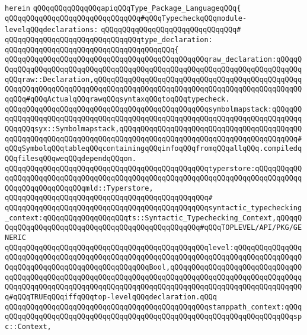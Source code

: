 \verb|herein|\newline
\newline
\verb|qQQqqQQqqQQqqQQqapiqQQqType_Package_LanguageqQQq{|\newline
\newline
\verb|qQQqqQQqqQQqqQQqqQQqqQQqqQQqqQQq#qQQqTypecheckqQQqmodule-levelqQQqdeclarations:|\newline
\verb|qQQqqQQqqQQqqQQqqQQqqQQqqQQqqQQq#|\newline
\verb|qQQqqQQqqQQqqQQqqQQqqQQqqQQqqQQqtype_declaration:|\newline
\verb|qQQqqQQqqQQqqQQqqQQqqQQqqQQqqQQqqQQqqQQq{|\newline
\verb|qQQqqQQqqQQqqQQqqQQqqQQqqQQqqQQqqQQqqQQqqQQqqQQqraw_declaration:qQQqqQQqqQQqqQQqqQQqqQQqqQQqqQQqqQQqqQQqqQQqqQQqqQQqqQQqqQQqqQQqqQQqqQQqqQQqqQQqraw::Declaration,qQQqqQQqqQQqqQQqqQQqqQQqqQQqqQQqqQQqqQQqqQQqqQQqqQQqqQQqqQQqqQQqqQQqqQQqqQQqqQQqqQQqqQQqqQQqqQQqqQQqqQQqqQQqqQQqqQQqqQQqqQQq#qQQqActualqQQqrawqQQqsyntaxqQQqtoqQQqtypecheck.|\newline
\verb|qQQqqQQqqQQqqQQqqQQqqQQqqQQqqQQqqQQqqQQqqQQqqQQqsymbolmapstack:qQQqqQQqqQQqqQQqqQQqqQQqqQQqqQQqqQQqqQQqqQQqqQQqqQQqqQQqqQQqqQQqqQQqqQQqqQQqqQQqqQQqsyx::Symbolmapstack,qQQqqQQqqQQqqQQqqQQqqQQqqQQqqQQqqQQqqQQqqQQqqQQqqQQqqQQqqQQqqQQqqQQqqQQqqQQqqQQqqQQqqQQqqQQqqQQqqQQqqQQqqQQqqQQq#qQQqSymbolqQQqtableqQQqcontainingqQQqinfoqQQqfromqQQqallqQQq.compiledqQQqfilesqQQqweqQQqdependqQQqon.|\newline
\verb|qQQqqQQqqQQqqQQqqQQqqQQqqQQqqQQqqQQqqQQqqQQqqQQqtyperstore:qQQqqQQqqQQqqQQqqQQqqQQqqQQqqQQqqQQqqQQqqQQqqQQqqQQqqQQqqQQqqQQqqQQqqQQqqQQqqQQqqQQqqQQqqQQqqQQqqQQqmld::Typerstore,|\newline
\verb|qQQqqQQqqQQqqQQqqQQqqQQqqQQqqQQqqQQqqQQqqQQqqQQq#|\newline
\verb|qQQqqQQqqQQqqQQqqQQqqQQqqQQqqQQqqQQqqQQqqQQqqQQqsyntactic_typechecking_context:qQQqqQQqqQQqqQQqqQQqts::Syntactic_Typechecking_Context,qQQqqQQqqQQqqQQqqQQqqQQqqQQqqQQqqQQqqQQqqQQqqQQqqQQq#qQQqTOPLEVEL/API/PKG/GENERIC|\newline
\verb|qQQqqQQqqQQqqQQqqQQqqQQqqQQqqQQqqQQqqQQqqQQqqQQqlevel:qQQqqQQqqQQqqQQqqQQqqQQqqQQqqQQqqQQqqQQqqQQqqQQqqQQqqQQqqQQqqQQqqQQqqQQqqQQqqQQqqQQqqQQqqQQqqQQqqQQqqQQqqQQqqQQqqQQqqQQqBool,qQQqqQQqqQQqqQQqqQQqqQQqqQQqqQQqqQQqqQQqqQQqqQQqqQQqqQQqqQQqqQQqqQQqqQQqqQQqqQQqqQQqqQQqqQQqqQQqqQQqqQQqqQQqqQQqqQQqqQQqqQQqqQQqqQQqqQQqqQQqqQQqqQQqqQQqqQQqqQQqqQQqqQQqqQQq#qQQqTRUEqQQqiffqQQqtop-levelqQQqdeclaration.qQQq|\newline
\verb|qQQqqQQqqQQqqQQqqQQqqQQqqQQqqQQqqQQqqQQqqQQqqQQqstamppath_context:qQQqqQQqqQQqqQQqqQQqqQQqqQQqqQQqqQQqqQQqqQQqqQQqqQQqqQQqqQQqqQQqqQQqqQQqspc::Context,|\newline
